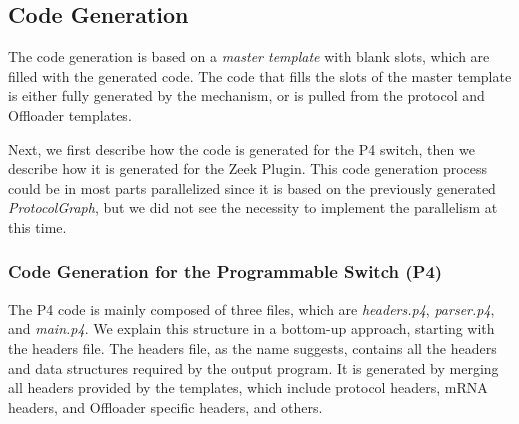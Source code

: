 \subsection{Code Generation}

The code generation is based on a \textit{master template} with blank slots, which are filled with the generated code. The code that fills the slots of the master template is either fully generated by the mechanism, or is pulled from the protocol and Offloader templates.

Next, we first describe how the code is generated for the P4 switch, then we describe how it is generated for the Zeek Plugin. This code generation process could be in most parts parallelized since it is based on the previously generated \textit{ProtocolGraph}, but we did not see the necessity to implement the parallelism at this time.

\subsubsection*{Code Generation for the Programmable Switch (P4)}

The P4 code is mainly composed of three files, which are \textit{headers.p4}, \textit{parser.p4}, and \textit{main.p4}. We explain this structure in a bottom-up approach, starting with the headers file. The headers file, as the name suggests, contains all the headers and data structures required by the output program. It is generated by merging all headers provided by the templates, which include protocol headers, mRNA headers, and Offloader specific headers\footnotemark{}, and others. 




